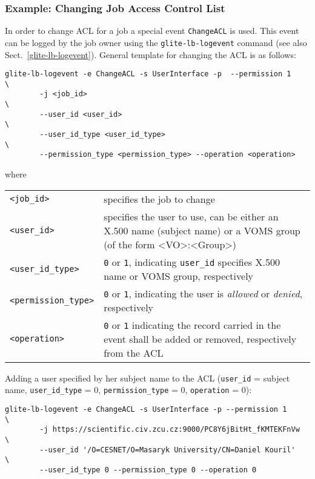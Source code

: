 \subsubsection{Example: Changing Job Access Control List}
\label{e:change-acl}

In order to change ACL for a job a special event \verb'ChangeACL' is used. This
event can be logged by the job owner using the \verb'glite-lb-logevent' command
(see also Sect.~\ref{glite-lb-logevent}). General template for changing the ACL
is as follows:

\begin{verbatim}
glite-lb-logevent -e ChangeACL -s UserInterface -p	--permission 1          \
        -j <job_id>                                                     \
        --user_id <user_id>                                             \
        --user_id_type <user_id_type>                                   \
        --permission_type <permission_type> --operation <operation>
\end{verbatim}

where

\begin{tabularx}{\textwidth}{lX}
\verb'<job_id>'    & specifies the job to change \\
\verb'<user_id>'   & specifies the user to use, can be either an X.500 name
                     (subject name) or a VOMS group (of the form <VO>:<Group>)\\
\verb'<user_id_type>'    & \verb'0' or \verb'1', indicating \verb'user_id'
                     specifies X.500 name or VOMS group, respectively \\
\verb'<permission_type>' & \verb'0' or \verb'1', indicating the user is 
                     \textit{allowed} or \textit{denied}, respectively \\
\verb'<operation>' & \verb'0' or \verb'1' indicating the record carried in
                     the event shall be added or removed, respectively from
		     the ACL \\
\end{tabularx}

Adding a user specified by her subject name to the ACL (\verb'user_id' =
subject name, \verb'user_id_type' = 0, \verb'permission_type' = 0,
\verb'operation' = 0):

\begin{verbatim}
glite-lb-logevent -e ChangeACL -s UserInterface -p --permission 1       \
        -j https://scientific.civ.zcu.cz:9000/PC8Y6jBitHt_fKMTEKFnVw    \
        --user_id '/O=CESNET/O=Masaryk University/CN=Daniel Kouril'     \
        --user_id_type 0 --permission_type 0 --operation 0
\end{verbatim}

